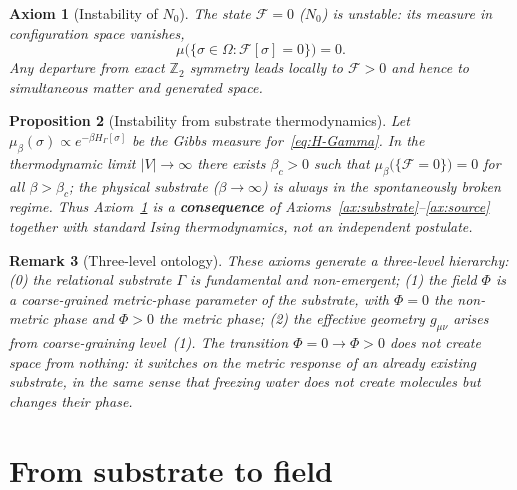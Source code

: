 \documentclass[11pt,a4paper]{article}
\renewcommand{\Phi}{\varPhi}
\newcommand{\Nzero}{N_{0}}
\newcommand{\Ffield}{\mathcal{F}}
\newcommand{\Zp}{\mathbb{Z}_{2}}
\newtheorem{axiom}{Axiom}
\newtheorem{proposition}[axiom]{Proposition}
\newtheorem{remark}[axiom]{Remark}
\begin{document}
\begin{axiom}[Instability of $\Nzero$]\label{ax:P3}
The state $\Ffield=0$ ($\Nzero$) is unstable: its measure in configuration
space vanishes,
\begin{equation}
  \mu\bigl(\{\sigma\in\Omega : \Ffield[\sigma]=0\}\bigr)=0.
\end{equation}
Any departure from exact $\Zp$ symmetry leads locally to $\Ffield>0$ and
hence to simultaneous matter and generated space.
\end{axiom}

\begin{proposition}[Instability from substrate thermodynamics]\label{prop:instability}
Let $\mu_{\beta}(\sigma)\propto e^{-\beta H_{\Gamma}[\sigma]}$ be the Gibbs
measure for~\eqref{eq:H-Gamma}. In the thermodynamic limit $|V|\to\infty$
there exists $\beta_{c}>0$ such that
$\mu_{\beta}\bigl(\{\Ffield=0\}\bigr)=0$ for all $\beta>\beta_{c}$; the
physical substrate ($\beta\to\infty$) is always in the spontaneously
broken regime. Thus Axiom~\ref{ax:P3} is a \textbf{consequence} of
Axioms~\ref{ax:substrate}--\ref{ax:source} together with standard Ising
thermodynamics, not an independent postulate.
\end{proposition}

\begin{remark}[Three-level ontology]
These axioms generate a three-level hierarchy:
(0) the relational substrate $\Gamma$ is fundamental and non-emergent;
(1) the field $\Phi$ is a coarse-grained \emph{metric-phase parameter} of
the substrate, with $\Phi=0$ the non-metric phase and $\Phi>0$ the metric
phase;
(2) the effective geometry $g_{\mu\nu}$ arises from coarse-graining
level~(1). The transition $\Phi=0\to\Phi>0$ does not create space from
nothing: it switches on the metric response of an already existing
substrate, in the same sense that freezing water does not create
molecules but changes their phase.
\end{remark}

\section{From substrate to field}\label{sec:substrate-to-field}
\end{document}

